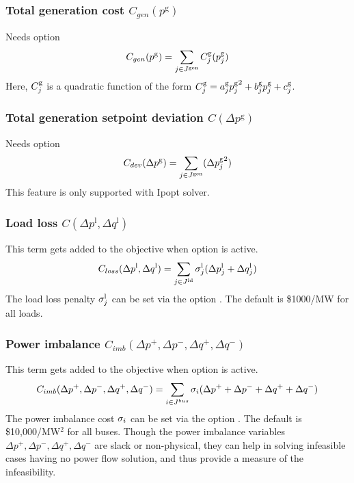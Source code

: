 \subsubsection{Total generation cost $C_{gen}(p^{\text{g}})$}
Needs option \opflowoption{\opflowobjective}{\mingencost}
\begin{equation}
C_{gen}(p^{\text{g}}) = \sum_{j \in J^\text{gen}} C^\text{g}_j(p^\text{g}_j)
\label{eq:opf_obj_mingencost}
\end{equation}
Here, $C^\text{g}_j$ is a quadratic function of the form $C^\text{g}_j = a^\text{g}_j{p^\text{g}_j}^2 + b^\text{g}_jp^\text{g}_j + c^\text{g}_j$.

\subsubsection{Total generation setpoint deviation $C(\Delta p^{\text{g}})$}
Needs option \opflowoption{\opflowobjective}{\mingensetpointdeviation}
\begin{equation}
C_{dev}(\Delta p^{\text{g}}) = \sum_{j \in J^\text{gen}} ({\Delta{p}^\text{g}_j}^2)
\label{eq:opf_obj_mingensetpointdev}
\end{equation}
This feature is only supported with Ipopt solver.

\subsubsection{Load loss $C(\Delta p^{\text{l}},\Delta q^{\text{l}})$}
This term gets added to the objective when  \option{\opflowincludeloadloss} option is active. 
\begin{equation}
C_{loss}(\Delta p^{\text{l}},\Delta q^{\text{l}}) =  \sum_{j \in J^\text{ld}}{\sigma^\text{l}_j({\Delta{p}^{\text{l}}_j} + {\Delta{q}^{\text{l}}_j})}
\label{eq:opf_obj_minloadloss}
\end{equation}
The load loss penalty $\sigma^\text{l}_j$ can be set via the option
. The default is \$1000/MW for all loads.

\subsubsection{Power imbalance $C_{imb}(\Delta p^{+},\Delta p^{-},\Delta q^{+},\Delta q^{-})$}
This term gets added to the objective when   option is active. 
\begin{equation}
C_{imb}(\Delta p^{+},\Delta p^{-},\Delta q^{+},\Delta q^{-}) =  \sum_{i \in J^{bus}}{\sigma_i(\Delta p^{+} + \Delta p^{-} + \Delta q^{+} + \Delta q^{-})}
\label{eq:opf_obj_minpowerimbalance}
\end{equation}
The power imbalance cost $\sigma_i$ can be set via the option
. The default is \$10,000/MW$^2$ for all buses. Though the power imbalance variables $\Delta p^{+},\Delta p^{-},\Delta q^{+},\Delta q^{-}$ are slack or non-physical, they can help in solving infeasible cases having no power flow solution, and thus provide a measure of the infeasibility. 

